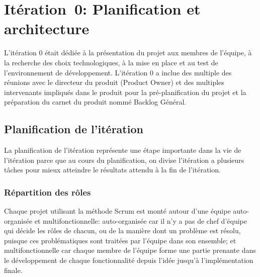 \chapter{Itération~0: Planification et architecture}
\label{sec:sprint0}


L'itération 0 était dédiée à la présentation du projet aux membres de l'équipe,
à la recherche des choix technologiques, à la mise en place et au test de
l'environnement de développement. L'itération 0 a inclue des multiple des
réunions avec le directeur du produit (Product Owner) et des multiples
intervenants impliqués dans le produit pour la pré-planification du projet et
la préparation du carnet du produit nommé Backlog Général.


\section{Planification de l'itération}

La planification de l'itération représente une étape importante dans la vie de
l'itération parce que au cours du planification, on divise l'itération a
plusieurs tâches pour mieux atteindre le résultats attendu à la fin de
l'itération.

\subsection{Répartition des rôles}

Chaque projet utilisant la méthode Scrum est monté autour d'une équipe
auto-organisée et multifonctionnelle: auto-organisée car il n'y a pas de chef
d'équipe qui décide les rôles de chacun, ou de la manière dont un problème est
résolu, puisque ces problématiques sont traitées par l'équipe dans son
ensemble; et multifonctionnelle car chaque membre de l'équipe forme une partie
prenante dans le développement de chaque fonctionnalité depuis l'idée jusqu'à
l'implémentation finale.

